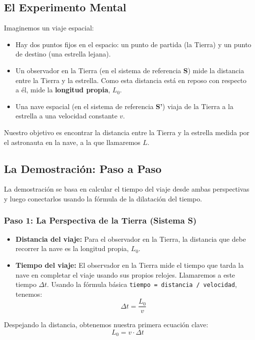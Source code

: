 \documentclass[11pt,a4paper]{article}
\begin{document}
\subsection*{El Experimento Mental}
Imaginemos un viaje espacial:
\begin{itemize}
    \item Hay dos puntos fijos en el espacio: un punto de partida (la Tierra) y un punto de destino (una estrella lejana).
    \item Un observador en la Tierra (en el sistema de referencia \textbf{S}) mide la distancia entre la Tierra y la estrella. Como esta distancia está en reposo con respecto a él, mide la \textbf{longitud propia}, $L_0$.
    \item Una nave espacial (en el sistema de referencia \textbf{S'}) viaja de la Tierra a la estrella a una velocidad constante $v$.
\end{itemize}
Nuestro objetivo es encontrar la distancia entre la Tierra y la estrella medida por el astronauta en la nave, a la que llamaremos $L$.

\subsection*{La Demostración: Paso a Paso}
La demostración se basa en calcular el tiempo del viaje desde ambas perspectivas y luego conectarlos usando la fórmula de la dilatación del tiempo.

\subsubsection*{Paso 1: La Perspectiva de la Tierra (Sistema S)}
\begin{itemize}
    \item \textbf{Distancia del viaje:} Para el observador en la Tierra, la distancia que debe recorrer la nave es la longitud propia, $L_0$.
    \item \textbf{Tiempo del viaje:} El observador en la Tierra mide el tiempo que tarda la nave en completar el viaje usando sus propios relojes. Llamaremos a este tiempo $\Delta t$. Usando la fórmula básica \texttt{tiempo = distancia / velocidad}, tenemos:
    \[ \Delta t = \frac{L_0}{v} \]
\end{itemize}
Despejando la distancia, obtenemos nuestra primera ecuación clave:
\begin{equation} \label{eq:dist_tierra}
    L_0 = v \cdot \Delta t
\end{equation}
\end{document}

